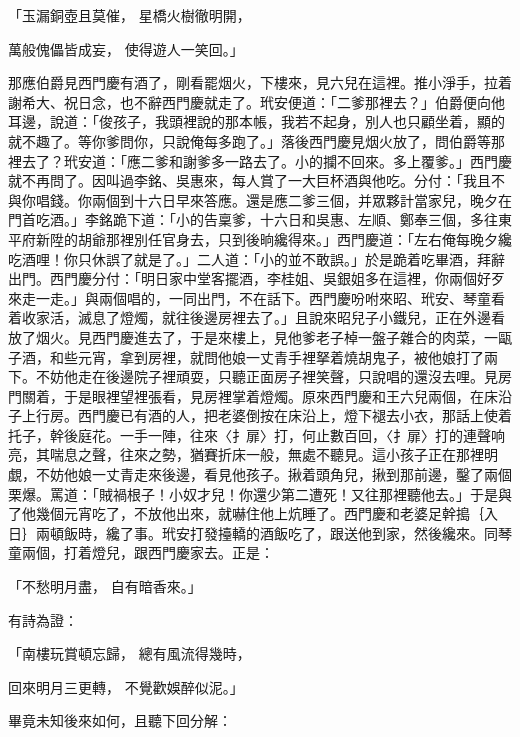 \begin{showcontents}{}
「玉漏銅壺且莫催，  星橋火樹徹明開，

萬般傀儡皆成妄，  使得遊人一笑回。」

那應伯爵見西門慶有酒了，剛看罷烟火，下樓來，見六兒在這裡。推小淨手，拉着謝希大、祝日念，也不辭西門慶就走了。玳安便道：「二爹那裡去？」伯爵便向他耳邊，說道：「俊孩子，我頭裡說的那本帳，我若不起身，別人也只顧坐着，顯的就不趣了。等你爹問你，只說俺每多跑了。」落後西門慶見烟火放了，問伯爵等那裡去了？玳安道：「應二爹和謝爹多一路去了。小的攔不回來。多上覆爹。」西門慶就不再問了。因叫過李銘、吳惠來，每人賞了一大巨杯酒與他吃。分付：「我且不與你唱錢。你兩個到十六日早來答應。還是應二爹三個，并眾夥計當家兒，晚夕在門首吃酒。」李銘跪下道：「小的告稟爹，十六日和吳惠、左順、鄭奉三個，多往東平府新陞的胡爺那裡別任官身去，只到後晌纔得來。」西門慶道：「左右俺每晚夕纔吃酒哩！你只休誤了就是了。」二人道：「小的並不敢誤。」於是跪着吃畢酒，拜辭出門。西門慶分付：「明日家中堂客擺酒，李桂姐、吳銀姐多在這裡，你兩個好歹來走一走。」與兩個唱的，一同出門，不在話下。西門慶吩咐來昭、玳安、琴童看着收家活，滅息了燈燭，就往後邊房裡去了。」且說來昭兒子小鐵兒，正在外邊看放了烟火。見西門慶進去了，于是來樓上，見他爹老子棹一盤子雜合的肉菜，一甌子酒，和些元宵，拿到房裡，就問他娘一丈青手裡拏着燒胡鬼子，被他娘打了兩下。不妨他走在後邊院子裡頑耍，只聽正面房子裡笑聲，只說唱的還沒去哩。見房門關着，于是眼裡望裡張看，見房裡掌着燈燭。原來西門慶和王六兒兩個，在床沿子上行房。西門慶已有酒的人，把老婆倒按在床沿上，燈下褪去小衣，那話上使着托子，幹後庭花。一手一陣，往來〈扌扉〉打，何止數百回，〈扌扉〉打的連聲响亮，其喘息之聲，往來之勢，猶賽折床一般，無處不聽見。這小孩子正在那裡明覷，不妨他娘一丈青走來後邊，看見他孩子。揪着頭角兒，揪到那前邊，鑿了兩個栗爆。罵道：「賊禍根子！小奴才兒！你還少第二遭死！又往那裡聽他去。」于是與了他幾個元宵吃了，不放他出來，就嚇住他上炕睡了。西門慶和老婆足幹搗｛入日｝兩頓飯時，纔了事。玳安打發擡轎的酒飯吃了，跟送他到家，然後纔來。同琴童兩個，打着燈兒，跟西門慶家去。正是：

「不愁明月盡，  自有暗香來。」

有詩為證：

「南樓玩賞頓忘歸，  總有風流得幾時，

回來明月三更轉，  不覺歡娛醉似泥。」

畢竟未知後來如何，且聽下回分解：




\end{showcontents}


